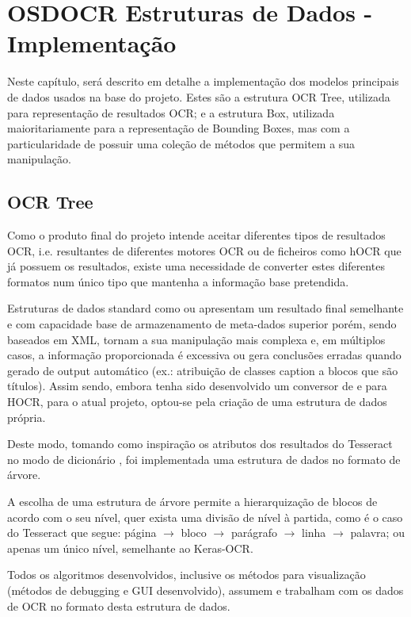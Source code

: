\chapter{OSDOCR Estruturas de Dados - Implementação}
\label{cap_osdocr_estrutura_dados_implementacao}

Neste capítulo, será descrito em detalhe a implementação dos modelos principais de dados usados na base do projeto. Estes são a estrutura OCR Tree, utilizada para representação de resultados OCR; e a estrutura Box, utilizada maioritariamente para a representação de Bounding Boxes, mas com a particularidade de possuir uma coleção de métodos que permitem a sua manipulação.


\section{OCR Tree}
\label{ocr_tree}

Como o produto final do projeto intende aceitar diferentes tipos de resultados OCR, i.e. resultantes de diferentes motores OCR ou de ficheiros como hOCR que já possuem os resultados, existe uma necessidade de converter estes diferentes formatos num único tipo que mantenha a informação base pretendida.

Estruturas de dados standard como \citep{hocr_doc} ou \citep{alto_doc} apresentam um resultado final semelhante e com capacidade base de armazenamento de meta-dados superior porém, sendo baseados em XML, tornam a sua manipulação mais complexa e, em múltiplos casos, a informação proporcionada é excessiva ou gera conclusões erradas quando gerado de output automático (ex.: atribuição de classes caption a blocos que são títulos). Assim sendo, embora tenha sido desenvolvido um conversor de e para HOCR, para o atual projeto, optou-se pela criação de uma estrutura de dados própria.

Deste modo, tomando como inspiração os atributos dos resultados do Tesseract no modo de dicionário \citep{tesseract_doc}, foi implementada uma estrutura de dados no formato de árvore.

A escolha de uma estrutura de árvore permite a hierarquização de blocos de acordo com o seu nível, quer exista uma divisão de nível à partida, como é o caso do Tesseract que segue: página $\longrightarrow$ bloco $\longrightarrow$ parágrafo $\longrightarrow$ linha $\longrightarrow$ palavra; ou apenas um único nível, semelhante ao Keras-OCR.

Todos os algoritmos desenvolvidos, inclusive os métodos para visualização (métodos de debugging e GUI desenvolvido), assumem e trabalham com os dados de OCR no formato desta estrutura de dados.

